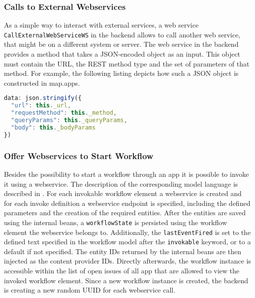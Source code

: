 \subsubsection{Calls to External Webservices}
As a simple way to interact with external services, a web service \lstinline|CallExternalWebServiceWS| in the backend allows to call another web service, that might be on a different system or server. The web service in the backend provides a method that takes a JSON-encoded object as an input. This object must contain the URL, the REST method type and the set of parameters of that method. For example, the following listing depicts how such a JSON object is constructed in map.apps.


\begin{lstlisting}[language=Javascript, label=lst:callExtWSJSON, caption=JSON-encoded object containing information to call an external web service]
data: json.stringify({
  "url": this._url,
  "requestMethod": this._method,
  "queryParams": this._queryParams,
  "body": this._bodyParams
})
\end{lstlisting}

\subsubsection{Offer Webservices to Start Workflow}
Besides the possibility to start a workflow through an app it is possible to invoke it using a webservice. The description of the corresponding model language is described in . For each invokable workflow element a webservice is created and for each invoke definition a webservice endpoint is specified, including the defined parameters and the creation of the required entities. After the entities are saved using the internal beans, a \lstinline|workflowState| is persisted using the workflow element the webservice belongs to. Additionally, the \lstinline|lastEventFired| is set to the defined text specified in the workflow model after the \lstinline[language=MD2]|invokable| keyword, or to a default if not specified. The entity IDs returned by the internal beans are then injected as the content provider IDs. Directly afterwards, the workflow instance is accessible within the list of open issues of all app that are allowed to view the invoked workflow element. Since a new workflow instance is created, the backend is creating a new random UUID for each webservice call.

